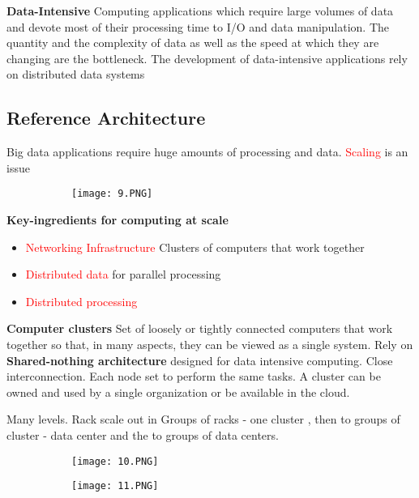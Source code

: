 \documentclass{article}
\begin{document}
\textbf{Data-Intensive}
\vspace{2mm}
Computing applications which require large volumes of data and devote most of their processing time to I/O and data manipulation. The quantity and the complexity of data as well as the speed at which they are changing are the bottleneck. The development of data-intensive applications rely on distributed data systems

\subsection{Reference Architecture}

Big data applications require huge amounts of processing and data. \textcolor{red}{Scaling} is an issue

\begin{figure}[ht!]
  \centering
  \begin{subfigure}[b]{0.5\linewidth}
    \texttt{[image: 9.PNG]}
  \end{subfigure}
\end{figure}

\textbf{Key-ingredients for computing at scale}
\vspace{2mm}

\begin{itemize}
    \item \textcolor{red}{Networking Infrastructure} Clusters of computers that work together 
    \item \textcolor{red}{Distributed data} for parallel processing
    \item \textcolor{red}{Distributed processing}
\end{itemize}

\textbf{Computer clusters}
Set of loosely or tightly connected computers that work together so that, in many aspects, they can be viewed as a single system.
Rely on \textbf{Shared-nothing architecture} designed for data intensive computing.
Close interconnection. Each node set to perform the same tasks. A cluster can be owned and used by a single organization or be available in the cloud.

Many levels. Rack scale out in Groups of racks - one cluster , then to groups of cluster - data center and the to groups of data centers.
\vspace{2mm}

\begin{figure}[ht!]
  \centering
  \begin{subfigure}[b]{0.39\linewidth}
    \texttt{[image: 10.PNG]}
  \end{subfigure}
  \begin{subfigure}[b]{0.4\textwidth}
         \centering
         \texttt{[image: 11.PNG]}
     \end{subfigure}
\end{figure}
\end{document}
